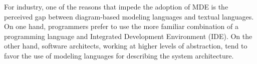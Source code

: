 
For industry, one of the reasons that impede the adoption of MDE is the perceived gap between diagram-based modeling
languages and textual languages.
On one hand, programmers prefer to use
the more familiar combination of a programming language
and Integrated Development Environment (IDE). 
On the other hand, software
architects, working at higher levels of abstraction, tend to favor
the use of modeling languages for
describing the system architecture.

	
	






